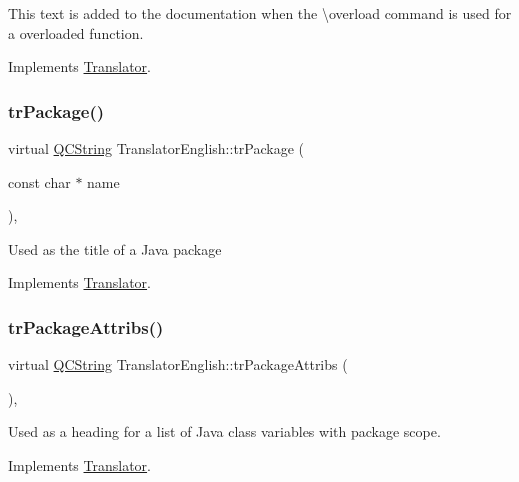 This text is added to the documentation when the \textbackslash{}overload command is used for a overloaded function. 

Implements \mbox{\hyperlink{class_translator}{Translator}}.

\mbox{\label{class_translator_english_a38a07c803b6a6c00c238153399183563}} 
\subsubsection{\texorpdfstring{trPackage()}{trPackage()}}
{\footnotesize\ttfamily virtual \mbox{\hyperlink{class_q_c_string}{Q\+C\+String}} Translator\+English\+::tr\+Package (\begin{DoxyParamCaption}\item[{const char $\ast$}]{name }\end{DoxyParamCaption})\hspace{0.3cm}{\ttfamily [inline]}, {\ttfamily [virtual]}}

Used as the title of a Java package 

Implements \mbox{\hyperlink{class_translator}{Translator}}.

\mbox{\label{class_translator_english_a4311e69e690953d905ff8c675768399a}} 
\subsubsection{\texorpdfstring{trPackageAttribs()}{trPackageAttribs()}}
{\footnotesize\ttfamily virtual \mbox{\hyperlink{class_q_c_string}{Q\+C\+String}} Translator\+English\+::tr\+Package\+Attribs (\begin{DoxyParamCaption}{ }\end{DoxyParamCaption})\hspace{0.3cm}{\ttfamily [inline]}, {\ttfamily [virtual]}}

Used as a heading for a list of Java class variables with package scope. 

Implements \mbox{\hyperlink{class_translator}{Translator}}.

\mbox{\label{class_translator_english_a313f8ce8728346ab9d63421d1436397b}} 
